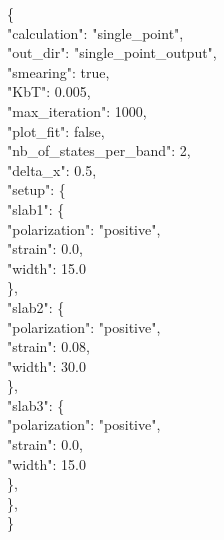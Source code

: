\documentclass[a4paper,12pt]{article}
\begin{document}
\begin{tabbing}
\{ \ \= \\
          \>"calculation": "single\_point", \\
           \>"out\_dir": "single\_point\_output", \\
           \>"smearing": true, \\
           \>"KbT": 0.005,\\
           \>"max\_iteration": 1000, \\
          \>"plot\_fit": false, \\
         \> "nb\_of\_states\_per\_band": 2, \\
          \>"delta\_x": 0.5, \\
          \>"setup": \{ \= \\
                   \>\> "slab1": \{ \= \\
                             \>\>\> "polarization": "positive", \\
                               \>\>\>"strain": 0.0, \\
                               \>\>\>"width": 15.0\\
                    \>\>\}, \\
                    \>\>"slab2": \{\= \\
                               \>\>\>"polarization": "positive",\\ 
                               \>\>\>"strain": 0.08, \\
                               \>\>\>"width": 30.0\\
                    \>\>\},\\
                    \>\>"slab3": \{\= \\
                               \>\>\>"polarization": "positive",\\ 
                              \>\>\> "strain": 0.0, \\
                               \>\>\>"width": 15.0\\
                    \>\>\}, \\

          \>\}, \\


\}\\
\end{tabbing}
\end{document}
